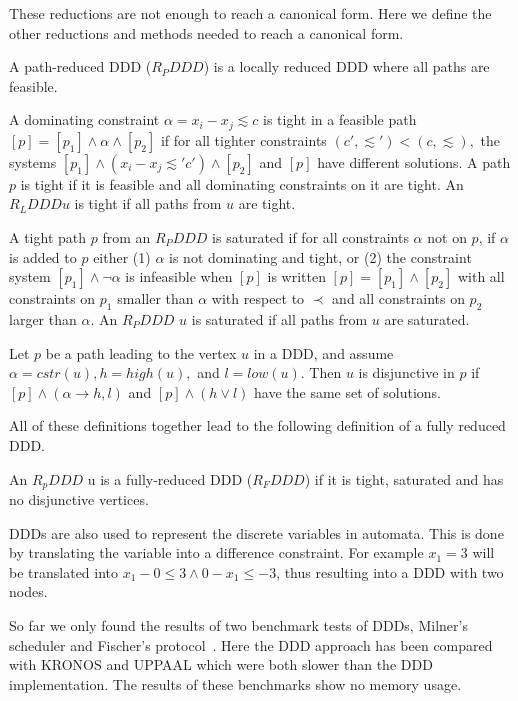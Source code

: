 These reductions are not enough to reach a canonical form. Here we define the other reductions and methods needed to reach a canonical form.

\begin{mydef}
A path-reduced DDD ($R_PDDD$) is a locally reduced DDD where all paths are feasible.
\end{mydef}

\begin{mydef}
A dominating constraint $\alpha = x_i - x_j \lesssim c$ is tight in a feasible path $[p] = [p_1] \wedge \alpha \wedge [p_2]$ if for all tighter constraints $(c', \lesssim') < (c,\lesssim),$ the systems $[p_1] \wedge (x_i - x_j \lesssim' c') \wedge [p_2]$ and $[p]$ have different solutions. A path $p$ is tight if it is feasible and all dominating constraints on it are tight. An $R_LDDD u$ is tight if all paths from $u$ are tight. 
\end{mydef}

\begin{mydef}
A tight path $p$ from an $R_PDDD$ is saturated if for all constraints $\alpha$ not on $p$, if $\alpha$ is added to $p$ either (1) $\alpha$ is not dominating and tight, or (2) the constraint system $[p_1] \wedge \neg\alpha$ is infeasible when $[p]$ is written $[p] = [p_1] \wedge [p_2]$ with all constraints on $p_1$ smaller than $\alpha$ with respect to $\prec$ and all constraints on $p_2$ larger than $\alpha$. An $R_PDDD$ $u$ is saturated if all paths from $u$ are saturated.
\end{mydef}

\begin{mydef}
Let $p$ be a path leading to the vertex $u$ in a DDD, and assume $\alpha = cstr(u), h = high(u),$ and $l = low(u)$. Then $u$ is disjunctive in $p$ if $[p] \wedge (\alpha \rightarrow h,l)$ and $[p] \wedge (h \vee l)$ have the same set of solutions.
\end{mydef}

All of these definitions together lead to the following definition of a fully reduced DDD.
% 
\begin{mydef}
\label{def:RFDDD}
An $R_pDDD$ u is a fully-reduced DDD ($R_FDDD$) if it is tight, saturated and has no disjunctive vertices.
\end{mydef}

DDDs are also used to represent the discrete variables in automata. This is done by translating the variable into a difference constraint. For example $x_1 = 3$ will be translated into $x_1 - 0 \leq 3 \wedge 0 - x_1 \leq -3$, thus resulting into a DDD with two nodes. 

So far we only found the results of two benchmark tests of DDDs, Milner's scheduler and Fischer's protocol~\cite{Møller200253}. Here the DDD approach has been compared with KRONOS and UPPAAL which were both slower than the DDD implementation. The results of these benchmarks show no memory usage.  